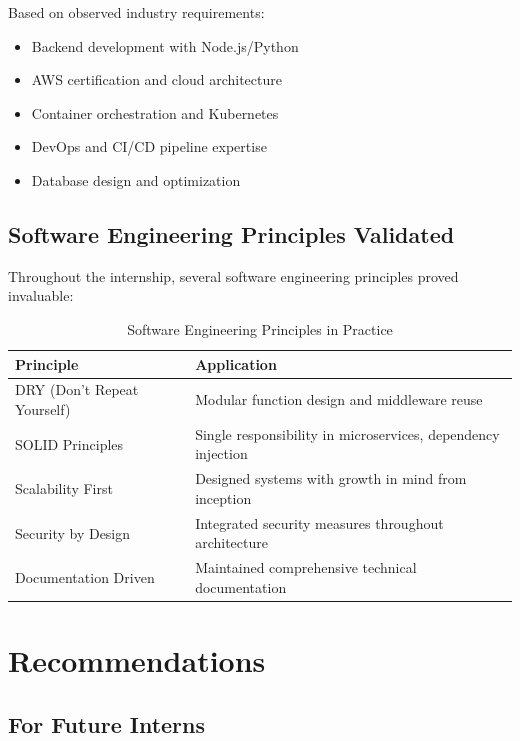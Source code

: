 Based on observed industry requirements:
\begin{itemize}
    \item Backend development with Node.js/Python
    \item AWS certification and cloud architecture
    \item Container orchestration and Kubernetes
    \item DevOps and CI/CD pipeline expertise
    \item Database design and optimization
\end{itemize}

\subsection{Software Engineering Principles Validated}

Throughout the internship, several software engineering principles proved invaluable:

\begin{table}[h]
    \centering
    \begin{tabularx}{\textwidth}{|l|X|}
        \hline
        \textbf{Principle} & \textbf{Application} \\
        \hline
        DRY (Don't Repeat Yourself) & Modular function design and middleware reuse \\
        \hline
        SOLID Principles & Single responsibility in microservices, dependency injection \\
        \hline
        Scalability First & Designed systems with growth in mind from inception \\
        \hline
        Security by Design & Integrated security measures throughout architecture \\
        \hline
        Documentation Driven & Maintained comprehensive technical documentation \\
        \hline
    \end{tabularx}
    \caption{Software Engineering Principles in Practice}
\end{table}

\newpage

\section{Recommendations}

\subsection{For Future Interns}

